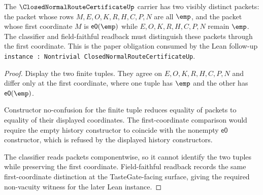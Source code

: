 \begin{theorem}
\label{thm:closed-normal-route-certificate-nontrivial-witness-obligation}
The $\ClosedNormalRouteCertificateUp$ carrier has two visibly distinct packets: the packet whose rows $M,E,O,K,R,H,C,P,N$ are all $\emp$, and the packet whose first coordinate $M$ is $\mathsf{e0}(\emp)$ while $E,O,K,R,H,C,P,N$ remain $\emp$. The classifier and field-faithful readback must distinguish these packets through the first coordinate. This is the paper obligation consumed by the Lean follow-up \texttt{instance : Nontrivial ClosedNormalRouteCertificateUp}.
\end{theorem}
\begin{proof}
Display the two finite tuples. They agree on $E,O,K,R,H,C,P,N$ and differ only at the first coordinate, where one tuple has $\emp$ and the other has $\mathsf{e0}(\emp)$.

Constructor no-confusion for the finite tuple reduces equality of packets to equality of their displayed coordinates. The first-coordinate comparison would require the empty history constructor to coincide with the nonempty $\mathsf{e0}$ constructor, which is refused by the displayed history constructors.

The classifier reads packets componentwise, so it cannot identify the two tuples while preserving the first coordinate. Field-faithful readback records the same first-coordinate distinction at the TasteGate-facing surface, giving the required non-vacuity witness for the later Lean instance.
\end{proof}


\begin{closurestatus}{\ClosedNormalRouteCertificateUp}
  \theoryclosure{\seedClosure}
  \formalstatus{\unformalizedV}
\end{closurestatus}

